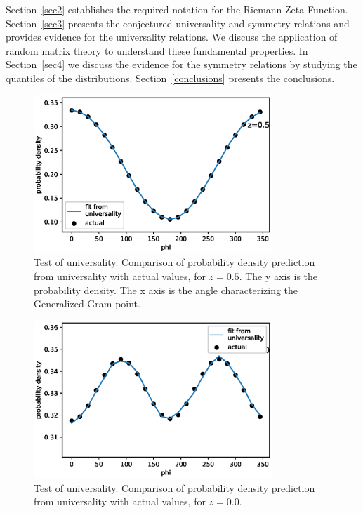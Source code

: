 \documentclass[twoside]{article}
\begin{document}
Section~\ref{sec2} establishes the required notation for the 
Riemann Zeta Function. 
Section~\ref{sec3} presents the conjectured universality and symmetry relations
and provides evidence for the universality relations. We discuss the application
of random matrix theory to understand these fundamental properties.
In Section~\ref{sec4} we discuss the evidence for the symmetry relations
by studying the quantiles of the distributions.
Section~\ref{conclusions} presents the conclusions. 


\begin{figure}
\centering
\includegraphics[width=0.8\textwidth]{z05.eps}
\caption[]{ 
 Test of universality. Comparison of probability density prediction from
 universality with actual values, for $z=0.5$. The y axis is the probability density.
 The x axis is the angle characterizing the Generalized Gram point.
  }
\vspace{1mm}
\label{z05}
\end{figure}

\begin{figure}
\centering
\includegraphics[width=0.8\textwidth]{z00.eps}
\caption[]{ 
 Test of universality. Comparison of probability density prediction from
 universality with actual values, for $z=0.0$. 
  }
\vspace{1mm}
\label{z00}
\end{figure}
\end{document}
